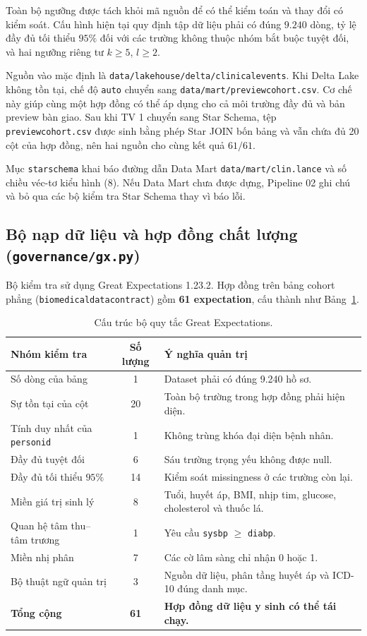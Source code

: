 \documentclass[11pt,a4paper]{article}
\renewcommand{\_}{\texorpdfstring{\origunderscore\allowbreak}{\origunderscore}}
\begin{document}
Toàn bộ ngưỡng được tách khỏi mã nguồn để có thể kiểm toán và thay đổi có kiểm soát. Cấu hình hiện tại quy định tập dữ liệu phải có đúng $9.240$ dòng, tỷ lệ đầy đủ tối thiểu $95\%$ đối với các trường không thuộc nhóm bắt buộc tuyệt đối, và hai ngưỡng riêng tư $k\geq5$, $l\geq2$.

Nguồn vào mặc định là \texttt{data/lakehouse/delta/clinical\_events}. Khi Delta Lake không tồn tại, chế độ \texttt{auto} chuyển sang \texttt{data/mart/preview\_cohort.csv}. Cơ chế này giúp cùng một hợp đồng có thể áp dụng cho cả môi trường đầy đủ và bản preview bàn giao. Sau khi TV 1 chuyển sang Star Schema, tệp \texttt{preview\_cohort.csv} được sinh bằng phép Star JOIN bốn bảng và vẫn chứa đủ 20 cột của hợp đồng, nên hai nguồn cho cùng kết quả $61/61$.

Mục \texttt{star\_schema} khai báo đường dẫn Data Mart \texttt{data/mart/clin.lance} và số chiều véc-tơ kiểu hình ($8$). Nếu Data Mart chưa được dựng, Pipeline 02 ghi chú và bỏ qua các bộ kiểm tra Star Schema thay vì báo lỗi.

\subsection{Bộ nạp dữ liệu và hợp đồng chất lượng (\texttt{governance/gx.py})}

Bộ kiểm tra sử dụng Great Expectations 1.23.2. Hợp đồng trên bảng cohort phẳng (\texttt{biomedical\_data\_contract}) gồm \textbf{61 expectation}, cấu thành như Bảng~\ref{tab:expectations}.

\begin{table}[ht]
\centering
\small
\begin{tabularx}{\textwidth}{>{\raggedright\arraybackslash}X c >{\raggedright\arraybackslash}X}
\toprule
\textbf{Nhóm kiểm tra} & \textbf{Số lượng} & \textbf{Ý nghĩa quản trị} \\
\midrule
Số dòng của bảng & 1 & Dataset phải có đúng 9.240 hồ sơ. \\
Sự tồn tại của cột & 20 & Toàn bộ trường trong hợp đồng phải hiện diện. \\
Tính duy nhất của \texttt{person\_id} & 1 & Không trùng khóa đại diện bệnh nhân. \\
Đầy đủ tuyệt đối & 6 & Sáu trường trọng yếu không được null. \\
Đầy đủ tối thiểu $95\%$ & 14 & Kiểm soát missingness ở các trường còn lại. \\
Miền giá trị sinh lý & 8 & Tuổi, huyết áp, BMI, nhịp tim, glucose, cholesterol và thuốc lá. \\
Quan hệ tâm thu--tâm trương & 1 & Yêu cầu \texttt{sys\_bp} $\geq$ \texttt{dia\_bp}. \\
Miền nhị phân & 7 & Các cờ lâm sàng chỉ nhận 0 hoặc 1. \\
Bộ thuật ngữ quản trị & 3 & Nguồn dữ liệu, phân tầng huyết áp và ICD-10 đúng danh mục. \\
\midrule
\textbf{Tổng cộng} & \textbf{61} & \textbf{Hợp đồng dữ liệu y sinh có thể tái chạy.} \\
\bottomrule
\end{tabularx}
\caption{Cấu trúc bộ quy tắc Great Expectations.}
\label{tab:expectations}
\end{table}
\end{document}
